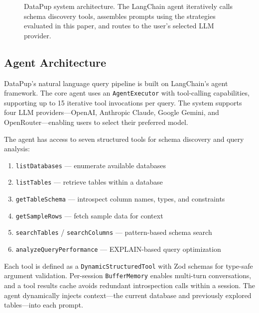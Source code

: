 \documentclass[sigconf, nonacm]{acmart}
\begin{document}
\begin{figure}[t]
{%
}
\caption{DataPup system architecture. The LangChain agent iteratively calls schema discovery tools, assembles prompts using the strategies evaluated in this paper, and routes to the user's selected LLM provider.}
\label{fig:architecture}
\end{figure}

\subsection{Agent Architecture}
DataPup's natural language query pipeline is built on LangChain's agent framework. The core agent uses an \texttt{AgentExecutor} with tool-calling capabilities, supporting up to 15 iterative tool invocations per query. The system supports four LLM providers---OpenAI, Anthropic Claude, Google Gemini, and OpenRouter---enabling users to select their preferred model.

The agent has access to seven structured tools for schema discovery and query analysis:
\begin{enumerate}
    \item \texttt{listDatabases} --- enumerate available databases
    \item \texttt{listTables} --- retrieve tables within a database
    \item \texttt{getTableSchema} --- introspect column names, types, and constraints
    \item \texttt{getSampleRows} --- fetch sample data for context
    \item \texttt{searchTables} / \texttt{searchColumns} --- pattern-based schema search
    \item \texttt{analyzeQueryPerformance} --- EXPLAIN-based query optimization
\end{enumerate}

Each tool is defined as a \texttt{Dynamic\-Structured\-Tool} with Zod schemas for type-safe argument validation. Per-session \texttt{Buffer\-Memory} enables multi-turn conversations, and a tool results cache avoids redundant introspection calls within a session. The agent dynamically injects context---the current database and previously explored tables---into each prompt.
\end{document}
